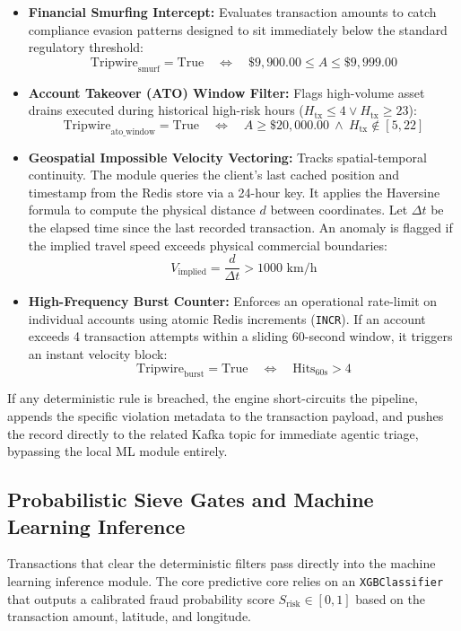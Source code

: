 \documentclass[12pt]{report}
\begin{document}
\begin{itemize}
    \item \textbf{Financial Smurfing Intercept:} Evaluates transaction amounts to catch compliance evasion patterns designed to sit immediately below the standard regulatory threshold:
    $$
        \text{Tripwire}_{\text{smurf}} = \text{True} \quad \iff \quad \$9,900.00 \le A \le \$9,999.00
    $$
    
    \item \textbf{Account Takeover (ATO) Window Filter:} Flags high-volume asset drains executed during historical high-risk hours ($H_{\text{tx}} \le 4 \lor H_{\text{tx}} \ge 23$):
    $$
        \text{Tripwire}_{\text{ato\_window}} = \text{True} \quad \iff \quad A \ge \$20,000.00 \ \land \ H_{\text{tx}} \notin [5, 22]
    $$
    
    \item \textbf{Geospatial Impossible Velocity Vectoring:} Tracks spatial-temporal continuity. The module queries the client's last cached position and timestamp from the Redis store via a 24-hour key. It applies the Haversine formula to compute the physical distance $d$ between coordinates. Let $\Delta t$ be the elapsed time since the last recorded transaction. An anomaly is flagged if the implied travel speed exceeds physical commercial boundaries:
    $$
        V_{\text{implied}} = \frac{d}{\Delta t} > 1000 \text{ km/h}
    $$
    
    \item \textbf{High-Frequency Burst Counter:} Enforces an operational rate-limit on individual accounts using atomic Redis increments (\texttt{INCR}). If an account exceeds 4 transaction attempts within a sliding 60-second window, it triggers an instant velocity block:
    $$
        \text{Tripwire}_{\text{burst}} = \text{True} \quad \iff \quad \text{Hits}_{\text{60s}} > 4
    $$
\end{itemize}
If any deterministic rule is breached, the engine short-circuits the pipeline, appends the specific violation metadata to the transaction payload, and pushes the record directly to the related Kafka topic for immediate agentic triage, bypassing the local ML module entirely.

\subsection{Probabilistic Sieve Gates and Machine Learning Inference}
Transactions that clear the deterministic filters pass directly into the machine learning inference module. The core predictive core relies on an \texttt{XGBClassifier} that outputs a calibrated fraud probability score $S_{\text{risk}} \in [0, 1]$ based on the transaction amount, latitude, and longitude. 
\end{document}
